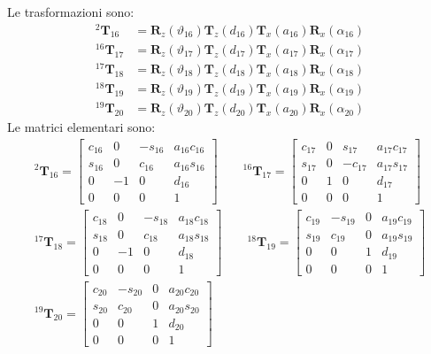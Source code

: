 Le trasformazioni sono:
\begin{align*}
{}^2\boldsymbol{T}_{16}&= \boldsymbol{R}_z(\vartheta_{16})\boldsymbol{T}_z(d_{16})\boldsymbol{T}_x(a_{16})\boldsymbol{R}_x(\alpha_{16})
\\
{}^{16}\boldsymbol{T}_{17}&= \boldsymbol{R}_z(\vartheta_{17})\boldsymbol{T}_z(d_{17})\boldsymbol{T}_x(a_{17})\boldsymbol{R}_x(\alpha_{17})
\\
{}^{17}\boldsymbol{T}_{18}&=\boldsymbol{R}_z(\vartheta_{18})\boldsymbol{T}_z(d_{18})\boldsymbol{T}_x(a_{18})\boldsymbol{R}_x(\alpha_{18})
\\
{}^{18}\boldsymbol{T}_{19}&=\boldsymbol{R}_z(\vartheta_{19})\boldsymbol{T}_z(d_{19})\boldsymbol{T}_x(a_{19})\boldsymbol{R}_x(\alpha_{19})
\\
{}^{19}\boldsymbol{T}_{20}&=\boldsymbol{R}_z(\vartheta_{20})\boldsymbol{T}_z(d_{20})\boldsymbol{T}_x(a_{20})\boldsymbol{R}_x(\alpha_{20})
\end{align*}
Le matrici elementari sono:
\begin{align*}
{}^2\boldsymbol{T}_{16}=
\begin{bmatrix}c_{16}&0&-s_{16}&a_{16}c_{16}\\s_{16}&0&c_{16}&a_{16}s_{16}\\0&-1&0&d_{16}\\0&0&0&1\end{bmatrix}
\qquad
{}^{16}\boldsymbol{T}_{17}=
\begin{bmatrix}c_{17}&0&s_{17}&a_{17}c_{17}\\s_{17}&0&-c_{17}&a_{17}s_{17}\\0&1&0&d_{17}\\0&0&0&1\end{bmatrix}
\\
{}^{17}\boldsymbol{T}_{18}=
\begin{bmatrix}c_{18}&0&-s_{18}&a_{18}c_{18}\\s_{18}&0&c_{18}&a_{18}s_{18}\\0&-1&0&d_{18}\\0&0&0&1\end{bmatrix}
\qquad
{}^{18}\boldsymbol{T}_{19}=
\begin{bmatrix}c_{19}&-s_{19}&0&a_{19}c_{19}\\s_{19}&c_{19}&0&a_{19}s_{19}\\0&0&1&d_{19}\\0&0&0&1\end{bmatrix}
\\ 
{}^{19}\boldsymbol{T}_{20}=
\begin{bmatrix}c_{20}&-s_{20}&0&a_{20}c_{20}\\s_{20}&c_{20}&0&a_{20}s_{20}\\0&0&1&d_{20}\\0&0&0&1\end{bmatrix}
\end{align*}

